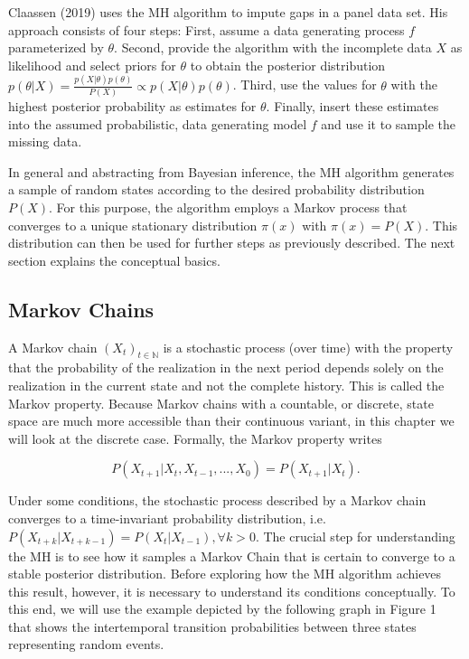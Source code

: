 \documentclass[12pt,english,a4paper,oneside]{article}
\theoremstyle{definition}
\theoremstyle{definition}
\theoremstyle{definition}
\theoremstyle{definition}
\theoremstyle{remark}
\begin{document}
\noindent
Claassen (2019) uses the MH algorithm to impute gaps in a panel data set. His approach consists of four steps: First, assume a data generating process \(f\) parameterized by \(\theta\). Second, provide the algorithm with the incomplete data \(X\) as likelihood and select priors for \(\theta\) to obtain the posterior distribution \(p(\theta|X) = \frac{p(X|\theta)p(\theta)}{P(X)} \propto p(X|\theta)p(\theta)\). Third, use the values for \(\theta\) with the highest posterior probability as estimates for \(\theta\). Finally, insert these estimates into the assumed probabilistic, data generating model \(f\) and use it to sample the missing data.\newline

\noindent
In general and abstracting from Bayesian inference, the MH algorithm generates a sample of random states according to the desired probability distribution \(P(X)\). For this purpose, the algorithm employs a Markov process that converges to a unique stationary distribution \(\pi(x)\) with \(\pi(x)=P(X)\). This distribution can then be used for further steps as previously described. The next section explains the conceptual basics.

\hypertarget{markov-chains}{%
\subsection{Markov Chains}\label{markov-chains}}

A Markov chain \((X_t)_{t \in \mathbb{N}}\) is a stochastic process (over time) with the property that the probability of the realization in the next period depends solely on the realization in the current state and not the complete history. This is called the Markov property. Because Markov chains with a countable, or discrete, state space are much more accessible than their continuous variant, in this chapter we will look at the discrete case. Formally, the Markov property writes

\begin{equation}
\label{eq:markov-property}
P(X_{t+1} |X_{t}, X_{t-1}, ..., X_{0}) = P(X_{t+1} |X_{t}).
\end{equation}

\noindent
Under some conditions, the stochastic process described by a Markov chain converges to a time-invariant probability distribution, i.e.~\(P(X_{t+k} |X_{t+k-1}) = P(X_{t} |X_{t-1}), \forall k>0\). The crucial step for understanding the MH is to see how it samples a Markov Chain that is certain to converge to a stable posterior distribution. Before exploring how the MH algorithm achieves this result, however, it is necessary to understand its conditions conceptually. To this end, we will use the example depicted by the following graph in Figure 1 that shows the intertemporal transition probabilities between three states representing random events.
\end{document}

